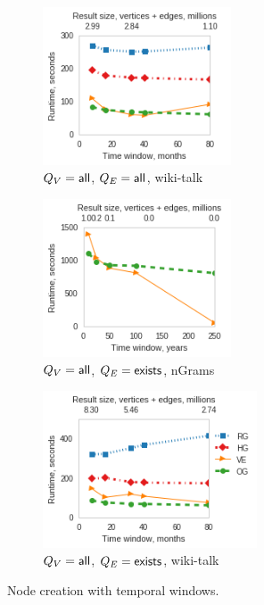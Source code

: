 \begin{figure}[t!]
\centering
\begin{subfigure}{0.3\textwidth}
\includegraphics[width=2.2in]{figs/agg_allall_wikitalk_build13.png}
\caption{$Q_V=\textsf{all}$, $Q_E=\textsf{all}$, wiki-talk}
\label{fig:agg1}
\end{subfigure}
\begin{subfigure}{0.3\textwidth}
\includegraphics[width=2.2in]{figs/agg_allexists_ngrams_build13.png}
\caption{$Q_V=\textsf{all}$, $Q_E=\textsf{exists}$, nGrams}
\label{fig:agg2}
\end{subfigure}
\begin{subfigure}{0.36\textwidth}
\includegraphics[width=2.5in]{figs/agg_allexists_wikitalk_build13.png}
\caption{$Q_V=\textsf{all}$, $Q_E=\textsf{exists}$, wiki-talk}
\label{fig:agg4}
\end{subfigure}
\vspace{-0.1in}
\caption[]{Node creation with temporal windows.}
\vspace{-0.1in}
\label{fig:agg}
\end{figure}

